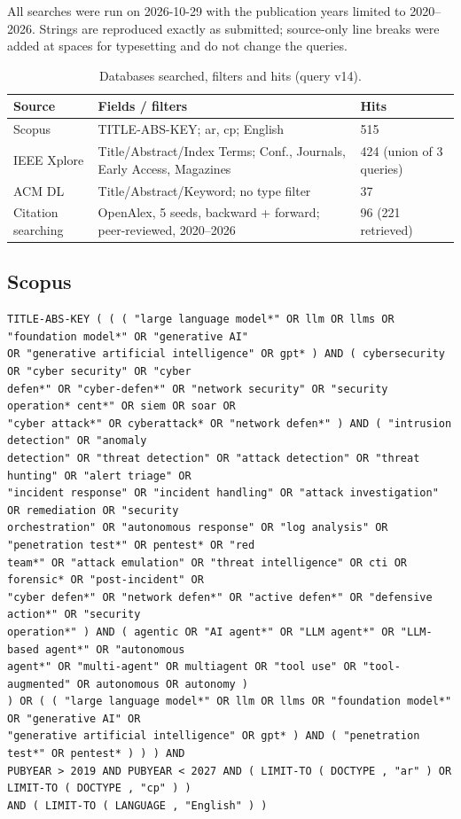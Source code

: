 All searches were run on 2026-10-29 with the publication years limited to 2020--2026. Strings are reproduced exactly as submitted; source-only line breaks were added at spaces for typesetting and do not change the queries.
\begin{table}[htbp]\centering\caption{Databases searched, filters and hits (query v14).}\label{tab:search-hits}
\begin{tabular}{lll}\toprule Source & Fields / filters & Hits \\ \midrule
Scopus & TITLE-ABS-KEY; ar, cp; English & 515 \\
IEEE Xplore & Title/Abstract/Index Terms; Conf., Journals, Early Access, Magazines & 424 (union of 3 queries) \\
ACM DL & Title/Abstract/Keyword; no type filter & 37 \\
Citation searching & OpenAlex, 5 seeds, backward + forward; peer-reviewed, 2020--2026 & 96 (221 retrieved) \\
\bottomrule\end{tabular}\end{table}
\subsection*{Scopus}
\begin{lstlisting}
TITLE-ABS-KEY ( ( ( "large language model*" OR llm OR llms OR "foundation model*" OR "generative AI"
OR "generative artificial intelligence" OR gpt* ) AND ( cybersecurity OR "cyber security" OR "cyber
defen*" OR "cyber-defen*" OR "network security" OR "security operation* cent*" OR siem OR soar OR
"cyber attack*" OR cyberattack* OR "network defen*" ) AND ( "intrusion detection" OR "anomaly
detection" OR "threat detection" OR "attack detection" OR "threat hunting" OR "alert triage" OR
"incident response" OR "incident handling" OR "attack investigation" OR remediation OR "security
orchestration" OR "autonomous response" OR "log analysis" OR "penetration test*" OR pentest* OR "red
team*" OR "attack emulation" OR "threat intelligence" OR cti OR forensic* OR "post-incident" OR
"cyber defen*" OR "network defen*" OR "active defen*" OR "defensive action*" OR "security
operation*" ) AND ( agentic OR "AI agent*" OR "LLM agent*" OR "LLM-based agent*" OR "autonomous
agent*" OR "multi-agent" OR multiagent OR "tool use" OR "tool-augmented" OR autonomous OR autonomy )
) OR ( ( "large language model*" OR llm OR llms OR "foundation model*" OR "generative AI" OR
"generative artificial intelligence" OR gpt* ) AND ( "penetration test*" OR pentest* ) ) ) AND
PUBYEAR > 2019 AND PUBYEAR < 2027 AND ( LIMIT-TO ( DOCTYPE , "ar" ) OR LIMIT-TO ( DOCTYPE , "cp" ) )
AND ( LIMIT-TO ( LANGUAGE , "English" ) )
\end{lstlisting}

